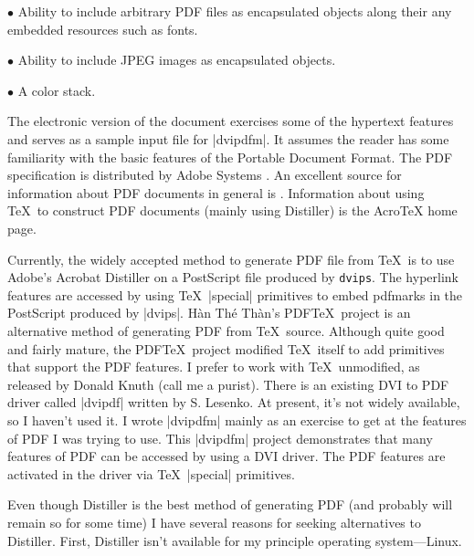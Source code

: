 \item{$\bullet$} Ability to include arbitrary PDF files as encapsulated
objects along their any embedded resources such as fonts.

\item{$\bullet$} Ability to include JPEG images as encapsulated
objects.

\item{$\bullet$} A color stack.
\endlist

The electronic version of the document exercises
some of the hypertext features and serves as
a sample input file for |dvipdfm|.
It assumes the reader has some familiarity with the basic features
of the Portable Document Format.  The PDF specification
is distributed by Adobe Systems .
An excellent source for information about PDF documents
in general is .  Information about
using \TeX\ to construct PDF documents (mainly using Distiller) is the
AcroTeX home page.

Currently, the widely accepted method to generate PDF file from \TeX\
is to use Adobe's Acrobat Distiller on a PostScript
file produced by {\tt dvips}.
The hyperlink features are accessed by using \TeX\ |special| primitives
to embed pdfmarks in the PostScript produced by |dvips|.
H\`an Th\'e Th\`an's PDF\TeX\ project is an alternative method
of generating PDF from \TeX\ source.
Although quite good and fairly mature, the PDF\TeX\ project
modified \TeX\ itself to add primitives that support the PDF features.
I prefer to work with \TeX\ unmodified, as released by Donald Knuth
(call me a purist).
There is an existing DVI to PDF driver called
|dvipdf| written by S. Lesenko.  At present, it's not widely
available, so I haven't used it.  I wrote |dvipdfm|
mainly as an exercise to get at the features
of PDF I was trying to use.  This |dvipdfm| project demonstrates that many features
of PDF can be accessed by using a DVI driver.
The PDF features are activated in the driver via
\TeX\ |special| primitives.

Even though Distiller is the best method of generating PDF (and
probably will remain so for some time) I have several reasons for
seeking alternatives to Distiller.
First, Distiller isn't available for my principle operating
system---Linux.

